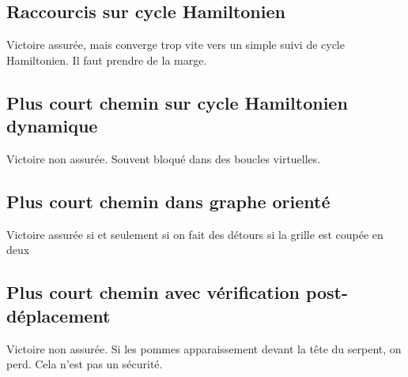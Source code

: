 \documentclass{article}
\begin{document}
\subsection{Raccourcis sur cycle Hamiltonien}
Victoire assurée, mais converge trop vite vers un simple suivi de cycle Hamiltonien. Il faut prendre de la marge.

\subsection{Plus court chemin sur cycle Hamiltonien dynamique}
Victoire non assurée. Souvent bloqué dans des boucles virtuelles.

\subsection{Plus court chemin dans graphe orienté}
Victoire assurée si et seulement si on fait des détours si la grille est coupée en deux

\subsection{Plus court chemin avec vérification post-déplacement}
Victoire non assurée. Si les pommes apparaissement devant la tête du serpent, on perd. Cela n'est pas un sécurité.










\end{document}
